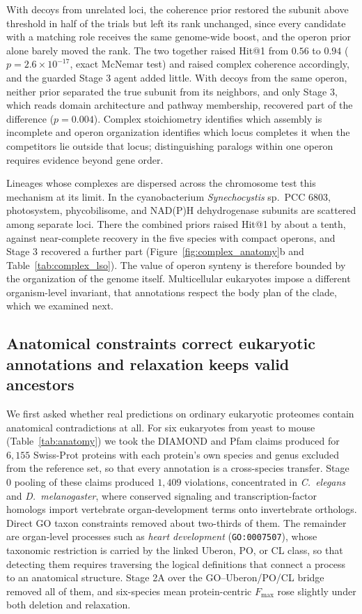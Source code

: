 \documentclass[10pt,twocolumn]{article}
\begin{document}
With decoys from unrelated loci, the coherence prior restored the subunit above threshold in half of the trials but left its rank unchanged, since every candidate with a matching role receives the same genome-wide boost, and the operon prior alone barely moved the rank. The two together raised Hit@1 from $0.56$ to $0.94$ ($p = 2.6 \times 10^{-17}$, exact McNemar test) and raised complex coherence accordingly, and the guarded Stage 3 agent added little. With decoys from the same operon, neither prior separated the true subunit from its neighbors, and only Stage 3, which reads domain architecture and pathway membership, recovered part of the difference ($p = 0.004$). Complex stoichiometry identifies which assembly is incomplete and operon organization identifies which locus completes it when the competitors lie outside that locus; distinguishing paralogs within one operon requires evidence beyond gene order.

Lineages whose complexes are dispersed across the chromosome test this mechanism at its limit. In the cyanobacterium \textit{Synechocystis} sp.\ PCC 6803, photosystem, phycobilisome, and NAD(P)H dehydrogenase subunits are scattered among separate loci. There the combined priors raised Hit@1 by about a tenth, against near-complete recovery in the five species with compact operons, and Stage 3 recovered a further part (Figure~\ref{fig:complex_anatomy}b and Table~\ref{tab:complex_lso}). The value of operon synteny is therefore bounded by the organization of the genome itself. Multicellular eukaryotes impose a different organism-level invariant, that annotations respect the body plan of the clade, which we examined next.

\subsection{Anatomical constraints correct eukaryotic annotations and relaxation keeps valid ancestors}
\label{sec:anatomy}



We first asked whether real predictions on ordinary eukaryotic proteomes contain anatomical contradictions at all. For six eukaryotes from yeast to mouse (Table~\ref{tab:anatomy}) we took the DIAMOND and Pfam claims produced for $6{,}155$ Swiss-Prot proteins with each protein's own species and genus excluded from the reference set, so that every annotation is a cross-species transfer. Stage 0 pooling of these claims produced $1{,}409$ violations, concentrated in \textit{C.~elegans} and \textit{D.~melanogaster}, where conserved signaling and transcription-factor homologs import vertebrate organ-development terms onto invertebrate orthologs. Direct GO taxon constraints removed about two-thirds of them. The remainder are organ-level processes such as \textit{heart development} (\texttt{GO:0007507}), whose taxonomic restriction is carried by the linked Uberon, PO, or CL class, so that detecting them requires traversing the logical definitions that connect a process to an anatomical structure. Stage 2A over the GO--Uberon/PO/CL bridge removed all of them, and six-species mean protein-centric $F_{\max}$ rose slightly under both deletion and relaxation.
\end{document}
